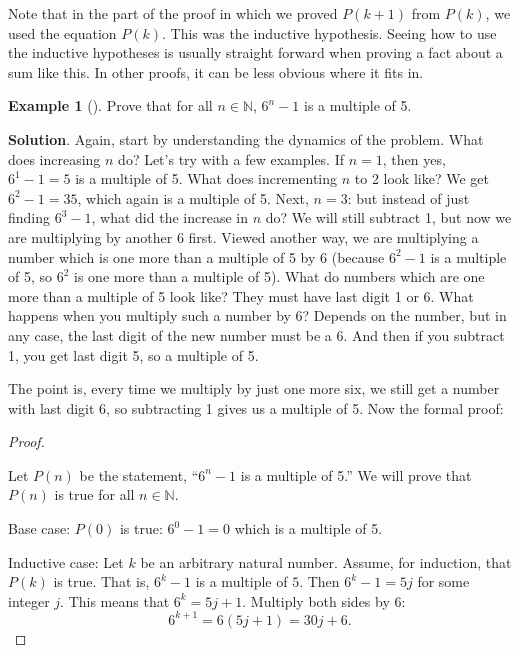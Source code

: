\documentclass[10pt,]{book}
\theoremstyle{plain}
\theoremstyle{definition}
\theoremstyle{definition}
\newtheorem{example}[theorem]{Example}
\theoremstyle{definition}
\theoremstyle{definition}
\numberwithin{equation}{chapter}
\def\N{\mathbb N}
\begin{document}
\hypertarget{p-2124}{}%
Note that in the part of the proof in which we proved \(P(k+1)\) from \(P(k)\), we used the equation \(P(k)\). This was the inductive hypothesis. Seeing how to use the inductive hypotheses is usually straight forward when proving a fact about a sum like this. In other proofs, it can be less obvious where it fits in.%
\begin{example}[]\label{example-75}
\hypertarget{p-2125}{}%
Prove that for all \(n \in \N\), \(6^n - 1\) is a multiple of 5.%
\par\smallskip%
\noindent\textbf{Solution}.\hypertarget{solution-197}{}\quad%
\hypertarget{p-2126}{}%
Again, start by understanding the dynamics of the problem. What does increasing \(n\) do? Let's try with a few examples. If \(n = 1\), then yes, \(6^1 - 1 = 5\) is a multiple of 5. What does incrementing \(n\) to 2 look like? We get \(6^2 - 1 = 35\), which again is a multiple of 5. Next, \(n = 3\): but instead of just finding \(6^3 - 1\), what did the increase in \(n\) do? We will still subtract 1, but now we are multiplying by another 6 first. Viewed another way, we are multiplying a number which is one more than a multiple of 5 by 6 (because \(6^2 - 1\) is a multiple of 5, so \(6^2\) is one more than a multiple of 5). What do numbers which are one more than a multiple of 5 look like? They must have last digit 1 or 6. What happens when you multiply such a number by 6? Depends on the number, but in any case, the last digit of the new number must be a 6. And then if you subtract 1, you get last digit 5, so a multiple of 5.%
\par
\hypertarget{p-2127}{}%
The point is, every time we multiply by just one more six, we still get a number with last digit 6, so subtracting 1 gives us a multiple of 5. Now the formal proof:%
\begin{proof}\hypertarget{proof-39}{}
\hypertarget{p-2128}{}%
Let \(P(n)\) be the statement, ``\(6^n - 1\) is a multiple of 5.'' We will prove that \(P(n)\) is true for all \(n \in \N\).%
\par
\hypertarget{p-2129}{}%
Base case: \(P(0)\) is true: \(6^0 -1 = 0\) which is a multiple of 5.%
\par
\hypertarget{p-2130}{}%
Inductive case: Let \(k\) be an arbitrary natural number. Assume, for induction, that \(P(k)\) is true. That is, \(6^k - 1\) is a multiple of \(5\). Then \(6^k - 1 = 5j\) for some integer \(j\). This means that \(6^k = 5j + 1\). Multiply both sides by \(6\):%
\begin{equation*}
6^{k+1} = 6(5j+1) = 30j + 6.

\end{equation*}
\end{proof}
\end{example}
\end{document}
